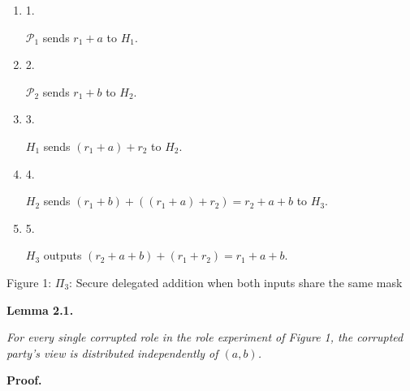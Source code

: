 \begin{enumerate}


\item[] 
1. 


$\mathcal{P}_{1}$ sends $r_{1}+a$ to $H_{1}$.\par





\item[] 
2. 


$\mathcal{P}_{2}$ sends $r_{1}+b$ to $H_{2}$.\par





\item[] 
3. 


$H_{1}$ sends $(r_{1}+a)+r_{2}$ to $H_{2}$.\par





\item[] 
4. 


$H_{2}$ sends $(r_{1}+b)+((r_{1}+a)+r_{2})=r_{2}+a+b$ to $H_{3}$.\par





\item[] 
5. 


$H_{3}$ outputs $(r_{2}+a+b)+(r_{1}+r_{2})=r_{1}+a+b$.\par





\end{enumerate}


Figure 1: $\Pi_{3}$: Secure delegated addition when both inputs share the same mask




\par\medskip\noindent\textbf{
\textbf{Lemma 2.1}\textbf{.}
}\par



\emph{For every single corrupted role in the role experiment of Figure 1, the corrupted party’s view is distributed independently of $(a,b)$.}\par






\par\medskip\noindent\textbf{Proof.}\par




